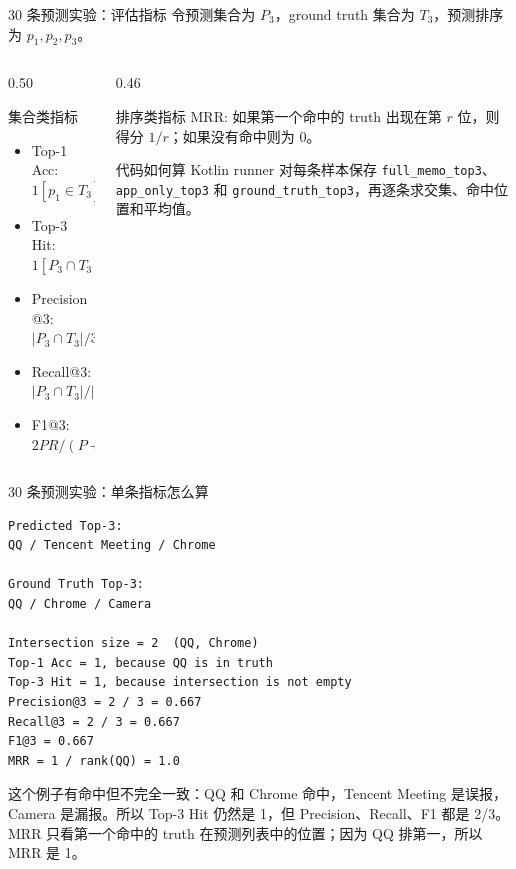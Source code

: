\documentclass[UTF8,aspectratio=169,10pt]{ctexbeamer}
\newcommand{\code}[1]{\texttt{\small #1}}
\newcommand{\explainfoot}[1]{%
  \vspace{0.35em}
  {\scriptsize\color{memoGray}#1}
}
\begin{document}
\begin{frame}{30 条预测实验：评估指标}
  \small
  令预测集合为 \(P_3\)，ground truth 集合为 \(T_3\)，预测排序为 \(p_1,p_2,p_3\)。
  \vspace{0.5em}
  \begin{columns}[T,totalwidth=\textwidth]
    \begin{column}{0.50\textwidth}
      \begin{block}{集合类指标}
        \begin{itemize}
          \item Top-1 Acc: \(1[p_1 \in T_3]\)
          \item Top-3 Hit: \(1[P_3 \cap T_3 \neq \emptyset]\)
          \item Precision@3: \(|P_3 \cap T_3| / 3\)
          \item Recall@3: \(|P_3 \cap T_3| / |T_3|\)
          \item F1@3: \(2PR/(P+R)\)
        \end{itemize}
      \end{block}
    \end{column}
    \begin{column}{0.46\textwidth}
      \begin{block}{排序类指标}
        MRR: 如果第一个命中的 truth 出现在第 \(r\) 位，则得分 \(1/r\)；如果没有命中则为 0。
      \end{block}
      \begin{block}{代码如何算}
        Kotlin runner 对每条样本保存 \code{full\_memo\_top3}、\code{app\_only\_top3} 和 \code{ground\_truth\_top3}，再逐条求交集、命中位置和平均值。
      \end{block}
    \end{column}
  \end{columns}
\end{frame}

\begin{frame}[fragile]{30 条预测实验：单条指标怎么算}
\begin{lstlisting}
Predicted Top-3:
QQ / Tencent Meeting / Chrome

Ground Truth Top-3:
QQ / Chrome / Camera

Intersection size = 2  (QQ, Chrome)
Top-1 Acc = 1, because QQ is in truth
Top-3 Hit = 1, because intersection is not empty
Precision@3 = 2 / 3 = 0.667
Recall@3 = 2 / 3 = 0.667
F1@3 = 0.667
MRR = 1 / rank(QQ) = 1.0
\end{lstlisting}
  \explainfoot{这个例子有命中但不完全一致：QQ 和 Chrome 命中，Tencent Meeting 是误报，Camera 是漏报。所以 Top-3 Hit 仍然是 1，但 Precision、Recall、F1 都是 2/3。MRR 只看第一个命中的 truth 在预测列表中的位置；因为 QQ 排第一，所以 MRR 是 1。}
\end{frame}
\end{document}
